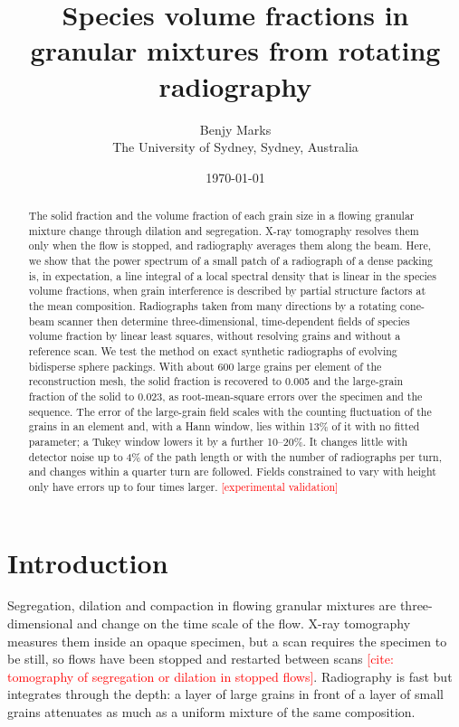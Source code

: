 \documentclass[11pt]{article}
\title{Species volume fractions in granular mixtures from rotating radiography}
\author{Benjy Marks\\ \small The University of Sydney, Sydney, Australia\\ \small \todo{co-authors}}
\date{\today}
\newcommand{\todo}[1]{\textcolor{red}{[#1]}}
\begin{document}
\maketitle

\begin{abstract}
The solid fraction and the volume fraction of each grain size in a flowing
granular mixture change through dilation and segregation. X-ray tomography
resolves them only when the flow is stopped, and radiography averages them
along the beam. Here, we show that the power spectrum of a small patch of a
radiograph of a dense packing is, in expectation, a line integral of a local
spectral density that is linear in the species volume fractions, when grain
interference is described by partial structure factors at the mean
composition. Radiographs taken from many directions by a rotating cone-beam
scanner then determine three-dimensional, time-dependent fields of species
volume fraction by linear least squares, without resolving grains and
without a reference scan. We test the method on exact synthetic radiographs
of evolving bidisperse sphere packings. With about 600 large grains per
element of the reconstruction mesh, the solid fraction is recovered to 0.005
and the large-grain fraction of the solid to 0.023, as root-mean-square
errors over the specimen and the sequence. The error of the large-grain
field scales with the counting fluctuation of the grains in an element and,
with a Hann window, lies within 13\% of it with no fitted parameter; a
Tukey window lowers it by a further 10--20\%. It changes little with detector noise up to 4\% of the
path length or with the number of radiographs per turn, and changes within
a quarter turn are followed. Fields constrained to vary with height only
have errors up to four times larger. \todo{experimental validation}
\end{abstract}

\section{Introduction}

Segregation, dilation and compaction in flowing granular mixtures are
three-dimensional and change on the time scale of the flow. X-ray tomography
measures them inside an opaque specimen, but a scan requires the specimen to
be still, so flows have been stopped and restarted between scans
\todo{cite: tomography of segregation or dilation in stopped flows}.
Radiography is fast but integrates through the depth: a layer of large
grains in front of a layer of small grains attenuates as much as a uniform
mixture of the same composition.
\end{document}
